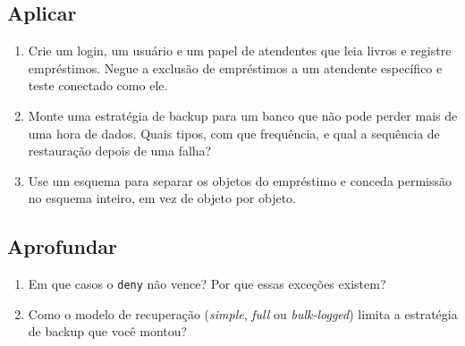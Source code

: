 \subsection*{Aplicar}
\begin{enumerate}
	\item Crie um login, um usuário e um papel de atendentes que leia
	livros e registre empréstimos. Negue a exclusão de empréstimos a um
	atendente específico e teste conectado como ele.
	\item Monte uma estratégia de backup para um banco que não pode perder
	mais de uma hora de dados. Quais tipos, com que frequência, e qual a
	sequência de restauração depois de uma falha?
	\item Use um esquema para separar os objetos do empréstimo e conceda
	permissão no esquema inteiro, em vez de objeto por objeto.
\end{enumerate}

\subsection*{Aprofundar}
\begin{enumerate}
	\item Em que casos o \texttt{deny} não vence? Por que essas exceções
	existem?
	\item Como o modelo de recuperação (\emph{simple}, \emph{full} ou
	\emph{bulk-logged}) limita a estratégia de backup que você montou?
\end{enumerate}
